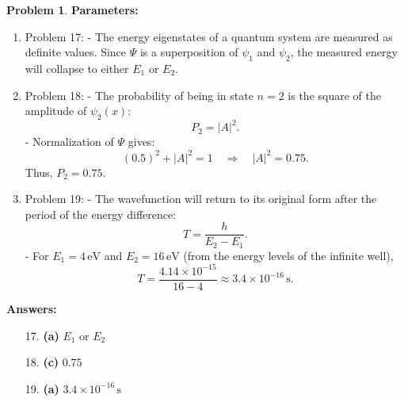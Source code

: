 \documentclass[12pt]{article}
\theoremstyle{definition} %
\newtheorem{problem}{Problem}
\theoremstyle{plain} %
\begin{document}
\begin{problem}
\textbf{Parameters:}
\begin{enumerate}
    \item Problem 17:
    - The energy eigenstates of a quantum system are measured as definite values. Since \(\Psi\) is a superposition of \(\psi_1\) and \(\psi_2\), the measured energy will collapse to either \(E_1\) or \(E_2\).
    
    \item Problem 18:
    - The probability of being in state \(n = 2\) is the square of the amplitude of \(\psi_2(x)\):
    $$
    P_2 = |A|^2.
    $$
    - Normalization of \(\Psi\) gives:
    $$
    (0.5)^2 + |A|^2 = 1 \quad \Rightarrow \quad |A|^2 = 0.75.
    $$
    Thus, \(P_2 = 0.75\).

    \item Problem 19:
    - The wavefunction will return to its original form after the period of the energy difference:
    $$
    T = \frac{h}{E_2 - E_1}.
    $$
    - For \(E_1 = 4 \, \text{eV}\) and \(E_2 = 16 \, \text{eV}\) (from the energy levels of the infinite well),
    $$
    T = \frac{4.14 \times 10^{-15}}{16 - 4} \approx 3.4 \times 10^{-16} \, \text{s}.
    $$
\end{enumerate}

\textbf{Answers:}
\begin{enumerate}
    \item[17.] \textbf{(a)} \(E_1\) or \(E_2\)
    \item[18.] \textbf{(c)} \(0.75\)
    \item[19.] \textbf{(a)} \(3.4 \times 10^{-16} \, \text{s}\)
\end{enumerate}

\end{problem}
\end{document}
